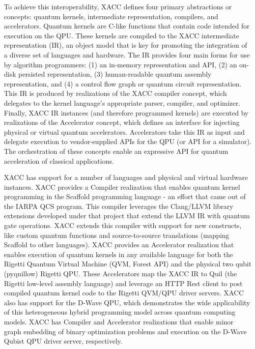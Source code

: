 \documentclass[letterpaper,10pt,english]{sphinxmanual}
\begin{document}
To achieve this interoperability, XACC defines four primary abstractions or concepts: quantum kernels, intermediate representation, compilers, and accelerators. Quantum kernels are C-like functions that contain code intended for execution on the QPU. These kernels are compiled to the XACC intermediate representation (IR), an object model that is key for promoting the integration of a diverse set of languages and hardware. The IR provides four main forms for use by algorithm programmers: (1) an in-memory representation and API, (2) an on-disk persisted representation, (3) human-readable quantum assembly representation, and (4) a control flow graph or quantum circuit representation. This IR is produced by realizations of the XACC compiler concept, which delegates to the kernel language’s appropriate parser, compiler, and optimizer. Finally, XACC IR instances (and therefore programmed kernels) are executed by realizations of the Accelerator concept, which defines an interface for injecting physical or virtual quantum accelerators. Accelerators take this IR as input and delegate execution to vendor-supplied APIs for the QPU (or API for a simulator). The orchestration of these concepts enable an expressive API for quantum acceleration of classical applications.

XACC has support for a number of languages and physical and virtual hardware instances. XACC provides a Compiler realization that enables quantum kernel programming in the Scaffold programming language - an effort that came out of the IARPA QCS program. This compiler leverages the Clang/LLVM library extensions developed under that project that extend the LLVM IR with quantum gate operations. XACC extends this compiler with support for new constructs, like custom quantum functions and source-to-source translations (mapping Scaffold to other languages). XACC provides an Accelerator realization that enables execution of quantum kernels in any available language for both the Rigetti Quantum Virtual Machine (QVM, Forest API) and the physical two qubit (pyquillow) Rigetti QPU. These Accelerators map the XACC IR to Quil (the Rigetti low-level assembly language) and leverage an HTTP Rest client to post compiled quantum kernel code to the Rigetti QVM/QPU driver servers. XACC also has support for the D-Wave QPU, which demonstrates the wide applicability of this heterogeneous hybrid programming model across quantum computing models. XACC has Compiler and Accelerator realizations that enable minor graph embedding of binary optimization problems and execution on the D-Wave Qubist QPU driver server, respectively.
\end{document}
